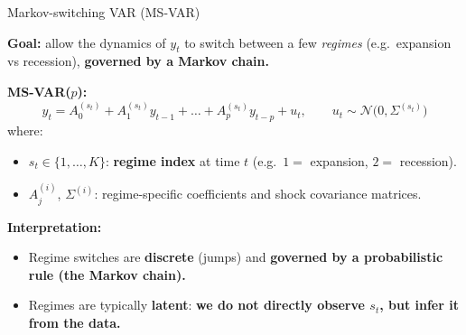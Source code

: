 \documentclass{beamer}
\begin{document}
\begin{frame}{Markov-switching VAR (MS-VAR)}
\small

\textbf{Goal:} allow the dynamics of $y_t$ to switch between a few \emph{regimes} (e.g.\ expansion vs recession),\textbf{ governed by a Markov chain.}

\medskip
\textbf{MS-VAR($p$):}
\[
y_t = A_0^{(s_t)} + A_1^{(s_t)} y_{t-1} + \dots + A_p^{(s_t)} y_{t-p} + u_t,
\qquad u_t \sim \mathcal{N}\big(0,\Sigma^{(s_t)}\big)
\]
where:
\begin{itemize}
  \item $s_t \in \{1,\dots,K\}$: \textbf{regime index} at time $t$
        (e.g.\ $1=$ expansion, $2=$ recession).
  \item $A_j^{(i)}$, $\Sigma^{(i)}$: regime-specific coefficients and shock covariance matrices.
\end{itemize}

\textbf{Interpretation:}
\begin{itemize}
  \item Regime switches are \textbf{discrete} (jumps) and\textbf{ governed by a probabilistic rule (the Markov chain).}
  \item Regimes are typically \textbf{latent}: \textbf{we do not directly observe $s_t$, but infer it from the data.}
\end{itemize}

\end{frame}
\end{document}
